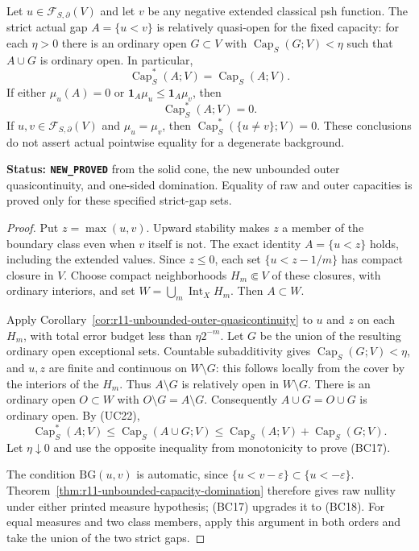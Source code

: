 \begin{corollary}
\label{cor:r11-boundary-outer-domination}
Let $u\in\mathcal F_{S,\partial}(V)$ and let $v$ be any
negative extended classical psh function. The strict actual gap
$A=\{u<v\}$ is relatively quasi-open for the fixed capacity:
for each $\eta>0$ there is an ordinary open $G\subset V$ with
$\operatorname{Cap}_S(G;V)<\eta$ such that $A\cup G$ is
ordinary open. In particular,
\[
                 \operatorname{Cap}_S^*(A;V)
                              =\operatorname{Cap}_S(A;V).
 \tag{BC17}
\]
If either $\mu_u(A)=0$ or
$\mathbf1_A\mu_u\leq\mathbf1_A\mu_v$, then
\[
                        \operatorname{Cap}_S^*(A;V)=0.
 \tag{BC18}
\]
If $u,v\in\mathcal F_{S,\partial}(V)$ and $\mu_u=\mu_v$,
then $\operatorname{Cap}_S^*(\{u\ne v\};V)=0$.
These conclusions do not assert actual pointwise equality for a
degenerate background.
\end{corollary}

\noindent\textbf{Status: \texttt{NEW\_PROVED}} from the solid
cone, the new unbounded outer quasicontinuity, and one-sided
domination. Equality of raw and outer capacities is proved only
for these specified strict-gap sets.

\begin{proof}
Put $z=\max(u,v)$. Upward stability makes $z$ a member of the
boundary class even when $v$ itself is not. The exact identity
$A=\{u<z\}$ holds, including the extended values. Since $z\leq0$,
each set $\{u<z-1/m\}$ has compact closure in $V$.
Choose compact neighborhoods $H_m\Subset V$ of these closures,
with ordinary interiors, and set $W=\bigcup_m\operatorname{Int}_X H_m$.
Then $A\subset W$.

Apply Corollary~\ref{cor:r11-unbounded-outer-quasicontinuity} to
$u$ and $z$ on each $H_m$, with total error budget less than
$\eta2^{-m}$. Let $G$ be the union of the resulting ordinary
open exceptional sets. Countable subadditivity gives
$\operatorname{Cap}_S(G;V)<\eta$, and $u,z$ are finite and
continuous on $W\setminus G$: this follows locally from the
cover by the interiors of the $H_m$. Thus $A\setminus G$ is
relatively open in $W\setminus G$. There is an ordinary open
$O\subset W$ with $O\setminus G=A\setminus G$.
Consequently $A\cup G=O\cup G$ is ordinary open. By (UC22),
\[
 \operatorname{Cap}_S^*(A;V)
 \leq\operatorname{Cap}_S(A\cup G;V)
 \leq\operatorname{Cap}_S(A;V)+\operatorname{Cap}_S(G;V).
\]
Let $\eta\downarrow0$ and use the opposite inequality from
monotonicity to prove (BC17).

The condition $\mathrm{BG}(u,v)$ is automatic, since
$\{u<v-\varepsilon\}\subset\{u<-\varepsilon\}$.
Theorem~\ref{thm:r11-unbounded-capacity-domination} therefore
gives raw nullity under either printed measure hypothesis;
(BC17) upgrades it to (BC18). For equal measures and two class
members, apply this argument in both orders and take the union
of the two strict gaps.
\end{proof}

